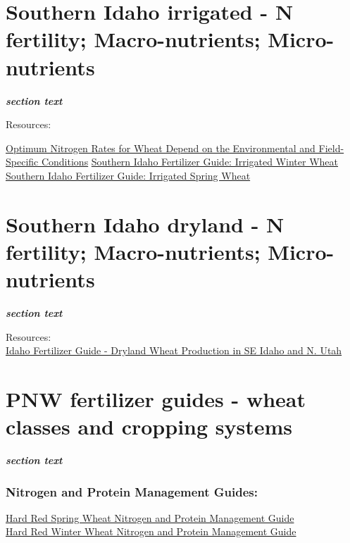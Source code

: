 \documentclass[
  letterpaper,
  DIV=11,
  numbers=noendperiod]{scrreprt}
\begin{document}
\section{Southern Idaho irrigated - N fertility; Macro-nutrients;
Micro-nutrients}\label{southern-idaho-irrigated---n-fertility-macro-nutrients-micro-nutrients}

\textbf{\emph{section text}}

Resources:

\href{https://verso.uidaho.edu/esploro/outputs/newsletterArticle/Optimum-Nitrogen-Rates-for-Wheat-Depend/996749626401851}{Optimum
Nitrogen Rates for Wheat Depend on the Environmental and Field-Specific
Conditions}
\href{https://www.uidaho.edu/-/media/uidaho-responsive/files/extension/publications/cis/cis0373.pdf}{Southern
Idaho Fertilizer Guide: Irrigated Winter Wheat}\\
\href{https://idahodocs.contentdm.oclc.org/digital/collection/p16293coll6/id/78702}{Southern
Idaho Fertilizer Guide: Irrigated Spring Wheat}

\section{Southern Idaho dryland - N fertility; Macro-nutrients;
Micro-nutrients}\label{southern-idaho-dryland---n-fertility-macro-nutrients-micro-nutrients}

\textbf{\emph{section text}}

Resources:\\
\href{https://objects.lib.uidaho.edu/uiext/uiext30376.pdf}{Idaho
Fertilizer Guide - Dryland Wheat Production in SE Idaho and N. Utah}

\section{PNW fertilizer guides - wheat classes and cropping
systems}\label{pnw-fertilizer-guides---wheat-classes-and-cropping-systems}

\textbf{\emph{section text}}

\subsubsection{Nitrogen and Protein Management
Guides:}\label{nitrogen-and-protein-management-guides}

\href{https://s3-us-west-2.amazonaws.com/smallgrains.wsu.edu/uploads/2019/03/Hard-Red-Spring-Wheat-Nitrogen-and-Protein-Brief-from-the-WA-Grain-Commission.pdf}{Hard
Red Spring Wheat Nitrogen and Protein Management Guide}\\
\href{https://wpcdn.web.wsu.edu/cahnrs/uploads/sites/16/Hard-Red-Winter-Wheat-Nitrogen-and-Protein-Brief-from-WA-Grain-Commission-2.pdf}{Hard
Red Winter Wheat Nitrogen and Protein Management Guide}
\end{document}
